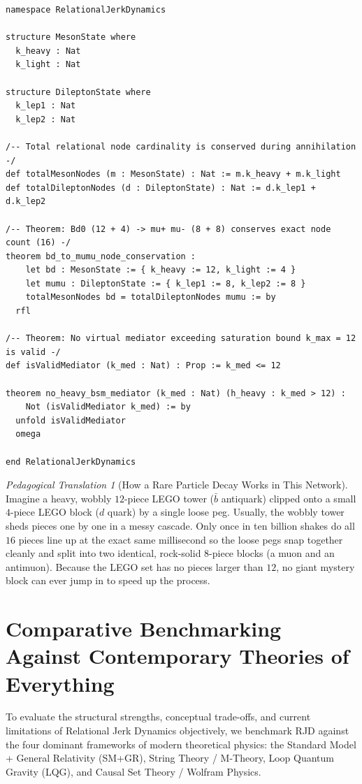 \documentclass[11pt,a4paper]{article}
\theoremstyle{plain}
\theoremstyle{definition}
\theoremstyle{remark}
\newtheorem{analogy}{Pedagogical Translation}[section]
\begin{document}
\begin{lstlisting}[caption={Lean 4 formalization of topological node conservation in Bd0 to mu+ mu- and mediator exclusion.},label={lst:lean_sec7}]
namespace RelationalJerkDynamics

structure MesonState where
  k_heavy : Nat
  k_light : Nat

structure DileptonState where
  k_lep1 : Nat
  k_lep2 : Nat

/-- Total relational node cardinality is conserved during annihilation -/
def totalMesonNodes (m : MesonState) : Nat := m.k_heavy + m.k_light
def totalDileptonNodes (d : DileptonState) : Nat := d.k_lep1 + d.k_lep2

/-- Theorem: Bd0 (12 + 4) -> mu+ mu- (8 + 8) conserves exact node count (16) -/
theorem bd_to_mumu_node_conservation :
    let bd : MesonState := { k_heavy := 12, k_light := 4 }
    let mumu : DileptonState := { k_lep1 := 8, k_lep2 := 8 }
    totalMesonNodes bd = totalDileptonNodes mumu := by
  rfl

/-- Theorem: No virtual mediator exceeding saturation bound k_max = 12 is valid -/
def isValidMediator (k_med : Nat) : Prop := k_med <= 12

theorem no_heavy_bsm_mediator (k_med : Nat) (h_heavy : k_med > 12) :
    Not (isValidMediator k_med) := by
  unfold isValidMediator
  omega

end RelationalJerkDynamics
\end{lstlisting}


\begin{analogy}[How a Rare Particle Decay Works in This Network]
Imagine a heavy, wobbly $12$-piece LEGO tower ($\bar{b}$ antiquark) clipped onto a small $4$-piece LEGO block ($d$ quark) by a single loose peg. Usually, the wobbly tower sheds pieces one by one in a messy cascade. Only once in ten billion shakes do all $16$ pieces line up at the exact same millisecond so the loose pegs snap together cleanly and split into two identical, rock-solid $8$-piece blocks (a muon and an antimuon). Because the LEGO set has no pieces larger than $12$, no giant mystery block can ever jump in to speed up the process.
\end{analogy}

\section{Comparative Benchmarking Against Contemporary Theories of Everything}
\label{sec:benchmarking}
To evaluate the structural strengths, conceptual trade-offs, and current limitations of Relational Jerk Dynamics objectively, we benchmark RJD against the four dominant frameworks of modern theoretical physics: the Standard Model + General Relativity (SM+GR), String Theory / M-Theory, Loop Quantum Gravity (LQG), and Causal Set Theory / Wolfram Physics.
\end{document}
